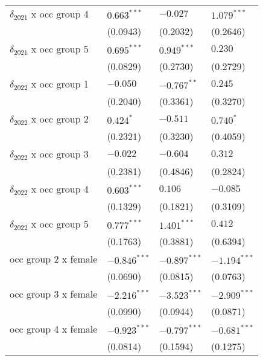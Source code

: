 \begin{tabular}{llll}
$\delta_{2021}$ x occ group 4          &   $0.663^{***}$ &        $-0.027$ &   $1.079^{***}$ \\
                                       &        (0.0943) &        (0.2032) &        (0.2646) \\
$\delta_{2021}$ x occ group 5          &   $0.695^{***}$ &   $0.949^{***}$ &         $0.230$ \\
                                       &        (0.0829) &        (0.2730) &        (0.2729) \\
$\delta_{2022}$ x occ group 1          &        $-0.050$ &   $-0.767^{**}$ &         $0.245$ \\
                                       &        (0.2040) &        (0.3361) &        (0.3270) \\
$\delta_{2022}$ x occ group 2          &       $0.424^*$ &        $-0.511$ &       $0.740^*$ \\
                                       &        (0.2321) &        (0.3230) &        (0.4059) \\
$\delta_{2022}$ x occ group 3          &        $-0.022$ &        $-0.604$ &         $0.312$ \\
                                       &        (0.2381) &        (0.4846) &        (0.2824) \\
$\delta_{2022}$ x occ group 4          &   $0.603^{***}$ &         $0.106$ &        $-0.085$ \\
                                       &        (0.1329) &        (0.1821) &        (0.3109) \\
$\delta_{2022}$ x occ group 5          &   $0.777^{***}$ &   $1.401^{***}$ &         $0.412$ \\
                                       &        (0.1763) &        (0.3881) &        (0.6394) \\
occ group 2 x female                   &  $-0.846^{***}$ &  $-0.897^{***}$ &  $-1.194^{***}$ \\
                                       &        (0.0690) &        (0.0815) &        (0.0763) \\
occ group 3 x female                   &  $-2.216^{***}$ &  $-3.523^{***}$ &  $-2.909^{***}$ \\
                                       &        (0.0990) &        (0.0944) &        (0.0871) \\
occ group 4 x female                   &  $-0.923^{***}$ &  $-0.797^{***}$ &  $-0.681^{***}$ \\
                                       &        (0.0814) &        (0.1594) &        (0.1275) \\

\end{tabular}
